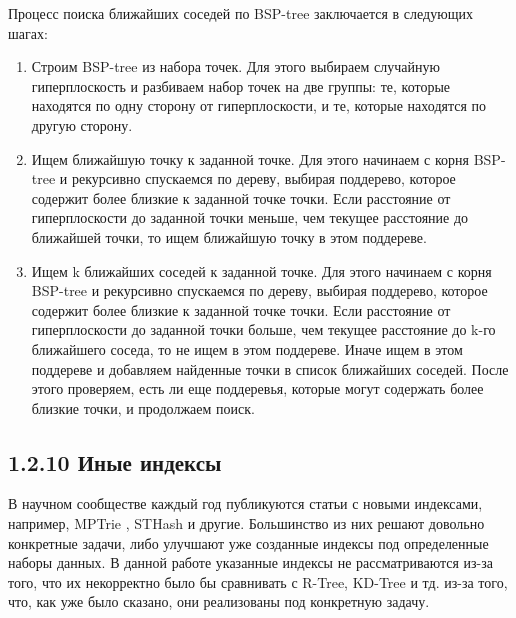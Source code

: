 Процесс поиска ближайших соседей по BSP-tree заключается в следующих шагах:
\begin{enumerate}
    \item Строим BSP-tree из набора точек. Для этого выбираем случайную гиперплоскость и разбиваем набор точек на две группы: те, которые находятся по одну сторону от гиперплоскости, и те, которые находятся по другую сторону.
    \item Ищем ближайшую точку к заданной точке. Для этого начинаем с корня BSP-tree и рекурсивно спускаемся по дереву, выбирая поддерево, которое содержит более близкие к заданной точке точки. Если расстояние от гиперплоскости до заданной точки меньше, чем текущее расстояние до ближайшей точки, то ищем ближайшую точку в этом поддереве.
    \item Ищем k ближайших соседей к заданной точке. Для этого начинаем с корня BSP-tree и рекурсивно спускаемся по дереву, выбирая поддерево, которое содержит более близкие к заданной точке точки. Если расстояние от гиперплоскости до заданной точки больше, чем текущее расстояние до k-го ближайшего соседа, то не ищем в этом поддереве. Иначе ищем в этом поддереве и добавляем найденные точки в список ближайших соседей. После этого проверяем, есть ли еще поддеревья, которые могут содержать более близкие точки, и продолжаем поиск.
\end{enumerate}

\subsection{1.2.10 Иные индексы}
В научном сообществе каждый год публикуются статьи с новыми индексами, например, MPTrie \cite{gantiMPTrie}, STHash\cite{guanSTHash} и другие. Большинство из них решают довольно конкретные задачи, либо улучшают уже созданные индексы под определенные наборы данных. В данной работе указанные индексы не рассматриваются из-за того, что их некорректно было бы сравнивать с R-Tree, KD-Tree и тд. из-за того, что, как уже было сказано, они реализованы под конкретную задачу. 